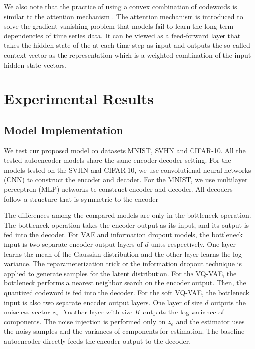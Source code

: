 \documentclass[letterpaper]{article} %
\begin{document}
We also note that the practice of using a convex combination of codewords is similar to the attention mechanism \cite{NIPS2017_7181}. The attention mechanism is introduced to solve the gradient vanishing problem that models fail to learn the long-term dependencies of time series data. It can be viewed as a feed-forward layer that takes the hidden state of the at each time step as input and outputs the so-called context vector as the representation which is a weighted combination of the input hidden state vectors.
\section{Experimental Results}
\subsection{Model Implementation}
We test our proposed model on datasets MNIST, SVHN and CIFAR-10. All the tested autoencoder models share the same encoder-decoder setting. For the models tested on the SVHN and CIFAR-10, we use convolutional neural networks (CNN) to construct the encoder and decoder. For the MNIST, we use multilayer perceptron (MLP) networks to construct encoder and decoder. All decoders follow a structure that is symmetric to the encoder.

The differences among the compared models are only in the bottleneck operation. The bottleneck operation takes the encoder output as its input, and its output is fed into the decoder. For VAE and information dropout models, the bottleneck input is two separate encoder output layers of $d$ units respectively. One layer learns the mean of the Gaussian distribution and the other layer learns the log variance. The reparameterization trick or the information dropout technique is applied to generate samples for the latent distribution. For the VQ-VAE, the bottleneck performs a nearest neighbor search on the encoder output. Then, the quantized codeword is fed into the decoder. For the soft VQ-VAE, the bottleneck input is also two separate encoder output layers. One layer of size $d$ outputs the noiseless vector $z_e$. Another layer with size $K$ outputs the log variance of components. The noise injection is performed only on $z_e$ and the estimator uses the noisy samples and the variances of components for estimation. The baseline autoencoder directly feeds the encoder output to the decoder.
\end{document}
